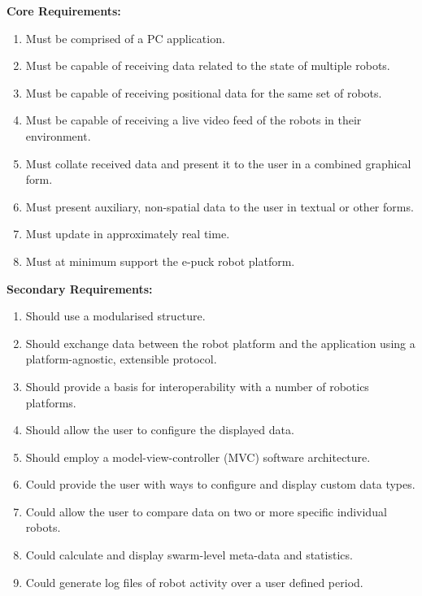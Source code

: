 \noindent\textbf{Core Requirements:}
\begin{enumerate}
	\item Must be comprised of a PC application.
	\item Must be capable of receiving data related to the state of multiple robots.
	\item Must be capable of receiving positional data for the same set of robots.
	\item Must be capable of receiving a live video feed of the robots in their environment.
	\item Must collate received data and present it to the user in a combined graphical form.
	\item Must present auxiliary, non-spatial data to the user in textual or other forms.
	\item Must update in approximately real time.
	\item Must at minimum support the e-puck robot platform.
\end{enumerate}

\noindent\textbf{Secondary Requirements:}
\begin{enumerate}
	\item Should use a modularised structure.
	\item Should exchange data between the robot platform and the application using a platform-agnostic, extensible protocol.
	\item Should provide a basis for interoperability with a number of robotics platforms.
	\item Should allow the user to configure the displayed data.
	\item Should employ a model-view-controller (MVC) software architecture.
	\item Could provide the user with ways to configure and display custom data types.
	\item Could allow the user to compare data on two or more specific individual robots.
	\item Could calculate and display swarm-level meta-data and statistics.
	\item Could generate log files of robot activity over a user defined period.
\end{enumerate}


